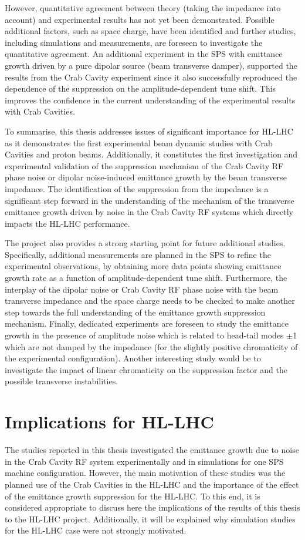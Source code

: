 However, quantitative agreement between theory (taking the impedance into account) and experimental results has not yet been demonstrated. Possible additional factors, such as space charge, have been identified and further studies, including simulations and measurements, are foreseen to investigate the quantitative agreement. An additional experiment in the SPS with emittance growth driven by a pure dipolar source (beam transverse damper), supported the results from the Crab Cavity experiment since it also successfully reproduced the dependence of the suppression on the amplitude-dependent tune shift. This improves the confidence in the current understanding of the experimental results with Crab Cavities.

To summarise, this thesis addresses issues of significant importance for HL-LHC as it demonstrates the first experimental beam dynamic studies with Crab Cavities and proton beams. Additionally, it constitutes the first investigation and experimental validation of the suppression mechanism of the Crab Cavity RF phase noise or dipolar noise-induced emittance growth by the beam transverse impedance. The identification of the suppression from the impedance is a significant step forward in the understanding of the mechanism of the transverse emittance growth driven by noise in the Crab Cavity RF systems which directly impacts the HL-LHC performance.

The project also provides a strong starting point for future additional studies.
Specifically, additional measurements are planned in the SPS to refine the experimental observations, by obtaining more data points showing emittance growth rate as a function of amplitude-dependent tune shift. Furthermore, the interplay of the dipolar noise or Crab Cavity RF phase noise with the beam transverse impedance and the space charge needs to be checked to make another step towards the full understanding of the emittance growth suppression mechanism. Finally, dedicated experiments are foreseen to study the emittance growth in the presence of amplitude noise which is related to head-tail modes $\pm$1 which are not damped by the impedance (for the slightly positive chromaticity of the experimental configuration). Another interesting study would be to investigate the impact of linear chromaticity on the suppression factor and the possible transverse instabilities.

\section{Implications for HL-LHC}
The studies reported in this thesis investigated the emittance growth due to noise in the Crab Cavity RF system experimentally and in simulations for one SPS machine configuration. However, the main motivation of these studies was the planned use of the Crab Cavities in the HL-LHC and the importance of the effect of the emittance growth suppression for the HL-LHC. To this end, it is considered appropriate to discuss here the implications of the results of this thesis to the HL-LHC project. Additionally, it will be explained why simulation studies for the HL-LHC case were not strongly motivated.

